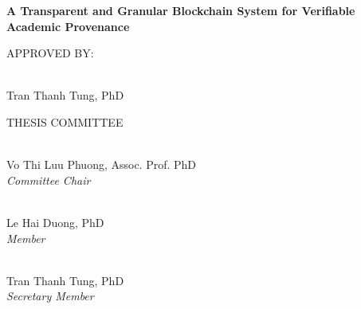 \begin{center}

\Large
\textbf{A Transparent and Granular
Blockchain System for Verifiable
Academic Provenance}


\vspace{3cm}

\large
APPROVED BY:\\

\vspace{1.5cm}

\underline{\hspace{5cm}}\\
Tran Thanh Tung, PhD\\
\vspace{1.5cm}



THESIS COMMITTEE

\vspace{1cm}

\underline{\hspace{5cm}}\\
Vo Thi Luu Phuong, Assoc. Prof. PhD\\
\textit{Committee Chair}\\
\vspace{1cm}

\underline{\hspace{5cm}}\\
Le Hai Duong, PhD\\
\textit{Member}\\
\vspace{1cm}

\underline{\hspace{5cm}}\\
Tran Thanh Tung, PhD\\
\textit{Secretary Member}\\
    
\end{center}







\pagebreak